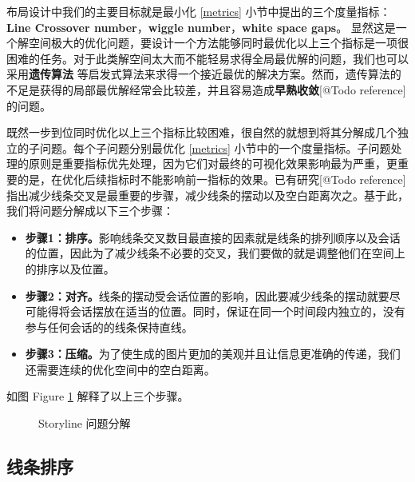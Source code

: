 布局设计中我们的主要目标就是最小化 \ref{metrics} 小节中提出的三个度量指标：\textbf{Line Crossover number}，\textbf{wiggle number}，\textbf{white space gaps}。 显然这是一个解空间极大的优化问题，要设计一个方法能够同时最优化以上三个指标是一项很困难的任务。对于此类解空间太大而不能轻易求得全局最优解的问题，我们也可以采用\textbf{遗传算法}\cite{tanahashi2012design} 等启发式算法来求得一个接近最优的解决方案。然而，遗传算法的不足是获得的局部最优解经常会比较差，并且容易造成\textbf{早熟收敛}[@Todo reference]的问题。

既然一步到位同时优化以上三个指标比较困难，很自然的就想到将其分解成几个独立的子问题。每个子问题分别最优化 \ref{metrics} 小节中的一个度量指标。子问题处理的原则是重要指标优先处理，因为它们对最终的可视化效果影响最为严重，更重要的是，在优化后续指标时不能影响前一指标的效果。已有研究[@Todo reference]指出减少线条交叉是最重要的步骤，减少线条的摆动以及空白距离次之。基于此，我们将问题分解成以下三个步骤：
\begin{itemize}
\item \textbf{步骤1：排序。}影响线条交叉数目最直接的因素就是线条的排列顺序以及会话的位置，因此为了减少线条不必要的交叉，我们要做的就是调整他们在空间上的排序以及位置。
\item \textbf{步骤2：对齐。}线条的摆动受会话位置的影响，因此要减少线条的摆动就要尽可能得将会话摆放在适当的位置。同时，保证在同一个时间段内独立的，没有参与任何会话的的线条保持直线。
\item \textbf{步骤3：压缩。}为了使生成的图片更加的美观并且让信息更准确的传递，我们还需要连续的优化空间中的空白距离。
\end{itemize}
如图 Figure \ref{fig:layout-steps} 解释了以上三个步骤。
\begin{figure}[!h]
  \caption{Storyline 问题分解}
  \label{fig:layout-steps}
\end{figure}
 
\subsection{线条排序}

